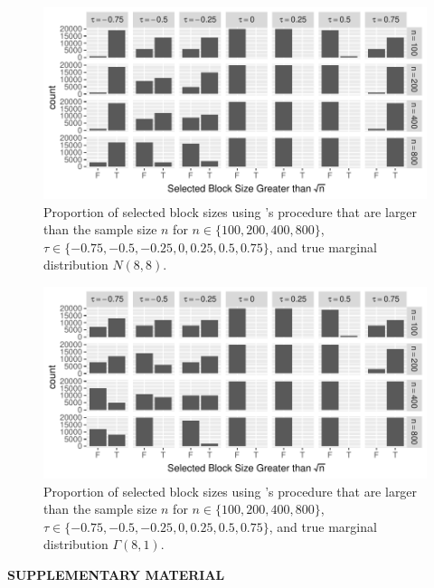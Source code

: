 \documentclass[12pt]{article}
\begin{document}
\begin{figure}[tbp]
  \centering
  \includegraphics[scale=1]{figures/large_block_normal}
  \caption{Proportion of selected block sizes using
  \citet{politis2004automatic}'s procedure that are larger than the sample size
    $n$ for $n \in \{100, 200, 400, 800\}$,
    $\tau \in \{-0.75, -0.5, -0.25, 0, 0.25, 0.5, 0.75\}$, and true marginal distribution
    $N(8,8)$.
  }
  \label{fig:large_block_normal}
\end{figure}

\begin{figure}[tbp]
  \centering
  \includegraphics[scale=1]{figures/large_block_gamma}
  \caption{Proportion of selected block sizes using
  \citet{politis2004automatic}'s procedure that are larger than the sample size
    $n$ for $n \in \{100, 200, 400, 800\}$,
    $\tau \in \{-0.75, -0.5, -0.25, 0, 0.25, 0.5, 0.75\}$, and true marginal distribution
    $\Gamma(8,1)$.
  }
  \label{fig:large_block_gamma}
\end{figure}

\bigskip
\begin{center}
{\large\bf SUPPLEMENTARY MATERIAL}
\end{center}
\end{document}
